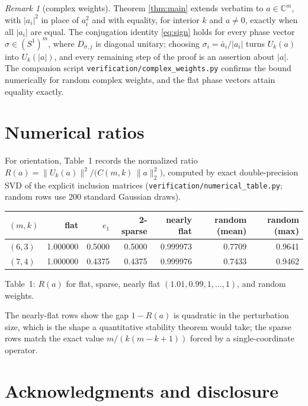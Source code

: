 \documentclass[11pt]{article}
\theoremstyle{remark}
\newtheorem{remark}[theorem]{Remark}
\begin{document}
\begin{remark}[complex weights]\label{rem:complex}
Theorem \ref{thm:main} extends verbatim to $a\in\mathbb C^m$, with
$|a_i|^2$ in place of $a_i^2$ and with equality, for interior $k$ and
$a\ne0$, exactly when all $|a_i|$ are equal. The conjugation identity
\eqref{eq:sign} holds for every phase vector $\sigma\in(S^1)^m$, where
$D_{\sigma,j}$ is diagonal unitary; choosing $\sigma_i=\bar a_i/|a_i|$
turns $U_k(a)$ into $U_k(|a|)$, and every remaining step of the proof is
an assertion about $|a|$. The companion script
\texttt{verification/complex\_weights.py} confirms the bound numerically
for random complex weights, and the flat phase vectors attain equality
exactly.
\end{remark}

\section{Numerical ratios}
For orientation, Table~1 records the normalized ratio
$R(a)=\|U_k(a)\|^2/\bigl(C(m,k)\,\|a\|_2^2\bigr)$, computed by exact
double-precision SVD of the explicit inclusion matrices
(\texttt{verification/numerical\_table.py}; random rows use 200 standard
Gaussian draws).

\begin{center}
\renewcommand{\arraystretch}{1.2}
\begin{tabular}{lrrrrrr}
\hline
$(m,k)$ & flat & $e_1$ & 2-sparse & nearly flat & random (mean) & random (max)\\
\hline
$(6,3)$ & 1.000000 & 0.5000 & 0.5000 & 0.999973 & 0.7709 & 0.9641\\
$(7,4)$ & 1.000000 & 0.4375 & 0.4375 & 0.999976 & 0.7433 & 0.9462\\
\hline
\end{tabular}

Table~1: $R(a)$ for flat, sparse, nearly flat
$(1.01,0.99,1,\dots,1)$, and random weights.
\end{center}

The nearly-flat rows show the gap $1-R(a)$ is quadratic in the
perturbation size, which is the shape a quantitative stability theorem
would take; the sparse rows match the exact value
$m/(k(m-k+1))$ forced by a single-coordinate operator.

\section*{Acknowledgments and disclosure}
\end{document}
